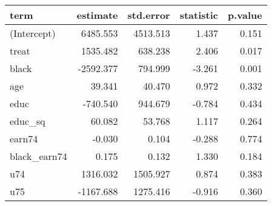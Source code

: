 \begin{tabular}{lrrrr}
  \hline
term & estimate & std.error & statistic & p.value \\ 
  \hline
(Intercept) & 6485.553 & 4513.513 & 1.437 & 0.151 \\ 
  treat & 1535.482 & 638.238 & 2.406 & 0.017 \\ 
  black & -2592.377 & 794.999 & -3.261 & 0.001 \\ 
  age & 39.341 & 40.470 & 0.972 & 0.332 \\ 
  educ & -740.540 & 944.679 & -0.784 & 0.434 \\ 
  educ\_sq & 60.082 & 53.768 & 1.117 & 0.264 \\ 
  earn74 & -0.030 & 0.104 & -0.288 & 0.774 \\ 
  black\_earn74 & 0.175 & 0.132 & 1.330 & 0.184 \\ 
  u74 & 1316.032 & 1505.927 & 0.874 & 0.383 \\ 
  u75 & -1167.688 & 1275.416 & -0.916 & 0.360 \\ 
   \hline
\end{tabular}
